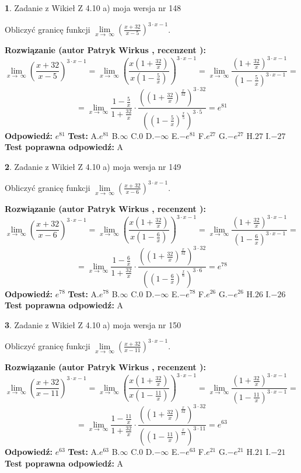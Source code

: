 \documentclass[12pt, a4paper]{article}
\theoremstyle{definition} %
\newtheorem{zad}{}
\newcommand{\zadStart}[1]{\begin{zad}#1\newline}
\newcommand{\zadStop}{\end{zad}}
\newcommand{\rozwStart}[2]{\noindent \textbf{Rozwiązanie (autor #1 , recenzent #2): }\newline}
\newcommand{\rozwStop}{\newline}
\newcommand{\odpStart}{\noindent \textbf{Odpowiedź:}\newline}
\newcommand{\odpStop}{\newline}
\newcommand{\testStart}{\noindent \textbf{Test:}\newline}
\newcommand{\testStop}{\newline}
\newcommand{\kluczStart}{\noindent \textbf{Test poprawna odpowiedź:}\newline}
\newcommand{\kluczStop}{\newline}
\begin{document}
\zadStart{Zadanie z Wikieł Z 4.10 a) moja wersja nr 148}

Obliczyć granicę funkcji  $\lim\limits_{x\to\ \infty}(\frac{x+32}{x-5})^{3\cdot x-1}$.
\zadStop
\rozwStart{Patryk Wirkus}{}
$$\lim\limits_{x\to\ \infty}(\frac{x+32}{x-5})^{3\cdot x-1} = \lim\limits_{x\to\ \infty}(\frac{x(1+\frac{32}{x})}{x(1-\frac{5}{x})})^{3\cdot x-1}=\lim\limits_{x\to\ \infty}\frac{(1+\frac{32}{x})^{3\cdot x-1}}{(1-\frac{5}{x})^{3\cdot x-1}}=$$
$$=\lim\limits_{x\to\ \infty}\frac{1-\frac{5}{x}}{1+\frac{32}{x}}\cdot\frac{((1+\frac{32}{x})^{\frac{x}{32}})^{3\cdot32}}{((1-\frac{5}{x})^{\frac{x}{5}})^{3\cdot5}}=e^{81}$$
\rozwStop
\odpStart
$e^{81}$
\odpStop
\testStart
A.$e^{81}$ B.$\infty$ C.$0$ D.$-\infty$ E.$-e^{81}$
F.$e^{27}$ G.$-e^{27}$
H.$27$
I.$-27$
\testStop
\kluczStart
A
\kluczStop



\zadStart{Zadanie z Wikieł Z 4.10 a) moja wersja nr 149}

Obliczyć granicę funkcji  $\lim\limits_{x\to\ \infty}(\frac{x+32}{x-6})^{3\cdot x-1}$.
\zadStop
\rozwStart{Patryk Wirkus}{}
$$\lim\limits_{x\to\ \infty}(\frac{x+32}{x-6})^{3\cdot x-1} = \lim\limits_{x\to\ \infty}(\frac{x(1+\frac{32}{x})}{x(1-\frac{6}{x})})^{3\cdot x-1}=\lim\limits_{x\to\ \infty}\frac{(1+\frac{32}{x})^{3\cdot x-1}}{(1-\frac{6}{x})^{3\cdot x-1}}=$$
$$=\lim\limits_{x\to\ \infty}\frac{1-\frac{6}{x}}{1+\frac{32}{x}}\cdot\frac{((1+\frac{32}{x})^{\frac{x}{32}})^{3\cdot32}}{((1-\frac{6}{x})^{\frac{x}{6}})^{3\cdot6}}=e^{78}$$
\rozwStop
\odpStart
$e^{78}$
\odpStop
\testStart
A.$e^{78}$ B.$\infty$ C.$0$ D.$-\infty$ E.$-e^{78}$
F.$e^{26}$ G.$-e^{26}$
H.$26$
I.$-26$
\testStop
\kluczStart
A
\kluczStop



\zadStart{Zadanie z Wikieł Z 4.10 a) moja wersja nr 150}

Obliczyć granicę funkcji  $\lim\limits_{x\to\ \infty}(\frac{x+32}{x-11})^{3\cdot x-1}$.
\zadStop
\rozwStart{Patryk Wirkus}{}
$$\lim\limits_{x\to\ \infty}(\frac{x+32}{x-11})^{3\cdot x-1} = \lim\limits_{x\to\ \infty}(\frac{x(1+\frac{32}{x})}{x(1-\frac{11}{x})})^{3\cdot x-1}=\lim\limits_{x\to\ \infty}\frac{(1+\frac{32}{x})^{3\cdot x-1}}{(1-\frac{11}{x})^{3\cdot x-1}}=$$
$$=\lim\limits_{x\to\ \infty}\frac{1-\frac{11}{x}}{1+\frac{32}{x}}\cdot\frac{((1+\frac{32}{x})^{\frac{x}{32}})^{3\cdot32}}{((1-\frac{11}{x})^{\frac{x}{11}})^{3\cdot11}}=e^{63}$$
\rozwStop
\odpStart
$e^{63}$
\odpStop
\testStart
A.$e^{63}$ B.$\infty$ C.$0$ D.$-\infty$ E.$-e^{63}$
F.$e^{21}$ G.$-e^{21}$
H.$21$
I.$-21$
\testStop
\kluczStart
A
\kluczStop
\end{document}
